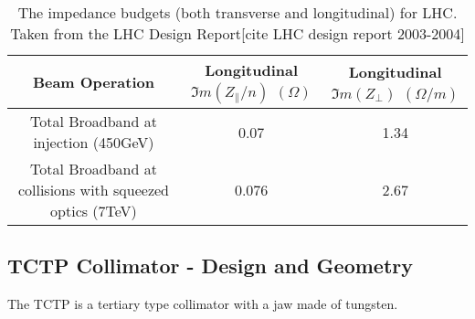 \begin{table}
\caption{The impedance budgets (both transverse and longitudinal) for LHC. Taken from the LHC Design Report[cite LHC design report 2003-2004]}
\begin{center}
\begin{tabular}{c | c | c}
Beam Operation & Longitudinal $\Im{}m ( Z_{\parallel}/n )$ $( \Omega )$ & Longitudinal $\Im{}m ( Z_{\perp} )$ $( \Omega /m )$\\ \hline
Total Broadband at injection (450GeV) & 0.07 & 1.34 \\ \hline
Total Broadband at collisions with squeezed optics (7TeV) & 0.076 & 2.67 \\ \hline
\end{tabular}
\end{center}
\label{tab:lhc-impedance-budget}
\end{table}


\subsection{TCTP Collimator - Design and Geometry}

The TCTP is a tertiary type collimator with a jaw made of tungsten. 


\begin{figure}
\subfigure[]{

\label{fig:cross-sec-ferr}
}
\subfigure[]{

\label{fig:cross-sec-rf-fingers}
}
\label{fig:tctp-figure}
\caption{}
\end{figure}